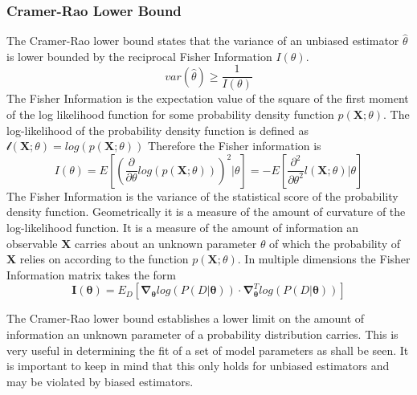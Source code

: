 \subsubsection{Cramer-Rao Lower Bound}
The Cramer-Rao lower bound states that the variance of an unbiased estimator $\hat{\theta}$ is lower bounded by the reciprocal Fisher Information $I(\theta)$.\cite{cramerrao} 
\begin{equation}
var(\hat{\theta}) \geq \frac{1}{I(\theta)}
\label{eq:cramerao}
\end{equation}
The Fisher Information is the expectation value of the square of the first moment of the log likelihood function for some probability density function $p(\mathbf{X};\theta)$. The log-likelihood of the probability density function is defined as $\mathcal{l}(\mathbf{X};\theta) = log(p(\mathbf{X};\theta))$
Therefore the Fisher information is 
\begin{equation}
I(\theta) = E\left[\left(\frac{\partial}{\partial \theta} log (p(\mathbf{X};\theta)) \right)^2 \Big| \theta \right] = -E\left[\frac{\partial^2}{\partial\theta^2} l(\mathbf{X};\theta) \Big| \theta \right]
\label{eq:fisherinformation}
\end{equation}
The Fisher Information is the variance of the statistical score of the probability density function. Geometrically it is a measure of the amount of curvature of the log-likelihood function. It is a measure of the amount of information an observable $\mathbf{X}$ carries about an unknown parameter $\theta$ of which the probability of $\mathbf{X}$ relies on according to the function $p(\mathbf{X};\theta)$. In multiple dimensions the Fisher Information matrix takes the form 
\begin{equation}
\mathbf{I}(\mathbf{\theta}) = E_D[\mathbf{\nabla}_\mathbf{\theta}log(P(D|\mathbf{\theta}))\cdot \mathbf{\nabla}^T_\mathbf{\theta}log(P(D|\mathbf{\theta}))]
\label{eq:fishermatrix}
\end{equation}

The Cramer-Rao lower bound establishes a lower limit on the amount of information an unknown parameter of a probability distribution carries.\cite{cramerrao2} This is very useful in determining the fit of a set of model parameters as shall be seen. It is important to keep in mind that this only holds for unbiased estimators and may be violated by biased estimators. 

